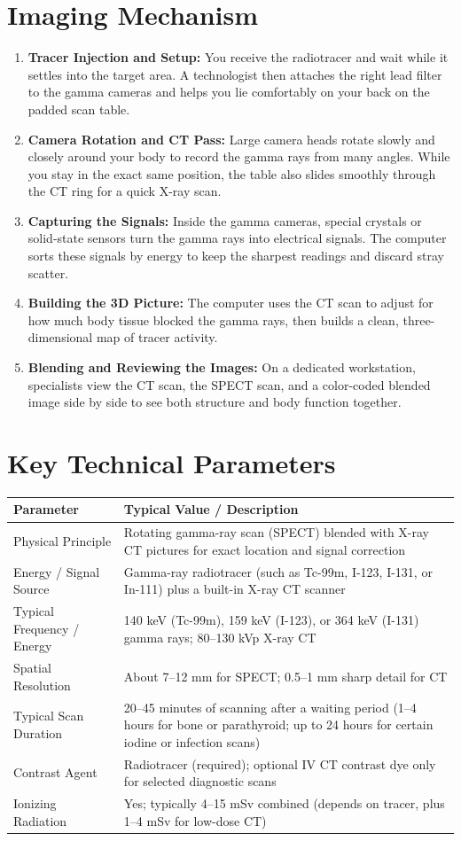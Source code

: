 \section{Imaging Mechanism}
\begin{enumerate}
    \item \textbf{Tracer Injection and Setup:} You receive the radiotracer and wait while it settles into the target area. A technologist then attaches the right lead filter to the gamma cameras and helps you lie comfortably on your back on the padded scan table.
    \item \textbf{Camera Rotation and CT Pass:} Large camera heads rotate slowly and closely around your body to record the gamma rays from many angles. While you stay in the exact same position, the table also slides smoothly through the CT ring for a quick X-ray scan.
    \item \textbf{Capturing the Signals:} Inside the gamma cameras, special crystals or solid-state sensors turn the gamma rays into electrical signals. The computer sorts these signals by energy to keep the sharpest readings and discard stray scatter.
    \item \textbf{Building the 3D Picture:} The computer uses the CT scan to adjust for how much body tissue blocked the gamma rays, then builds a clean, three-dimensional map of tracer activity.
    \item \textbf{Blending and Reviewing the Images:} On a dedicated workstation, specialists view the CT scan, the SPECT scan, and a color-coded blended image side by side to see both structure and body function together.
\end{enumerate}

\section{Key Technical Parameters}
\noindent
\begin{tabularx}{\textwidth}{@{}l X@{}}
\toprule
\textbf{Parameter} & \textbf{Typical Value / Description} \\
\midrule
Physical Principle & Rotating gamma-ray scan (SPECT) blended with X-ray CT pictures for exact location and signal correction \\
Energy / Signal Source & Gamma-ray radiotracer (such as Tc-99m, I-123, I-131, or In-111) plus a built-in X-ray CT scanner \\
Typical Frequency / Energy & 140 keV (Tc-99m), 159 keV (I-123), or 364 keV (I-131) gamma rays; 80--130 kVp X-ray CT \\
Spatial Resolution & About 7--12 mm for SPECT; 0.5--1 mm sharp detail for CT \\
Typical Scan Duration & 20--45 minutes of scanning after a waiting period (1--4 hours for bone or parathyroid; up to 24 hours for certain iodine or infection scans) \\
Contrast Agent & Radiotracer (required); optional IV CT contrast dye only for selected diagnostic scans \\
Ionizing Radiation & Yes; typically 4--15 mSv combined (depends on tracer, plus 1--4 mSv for low-dose CT) \\
\bottomrule
\end{tabularx}


